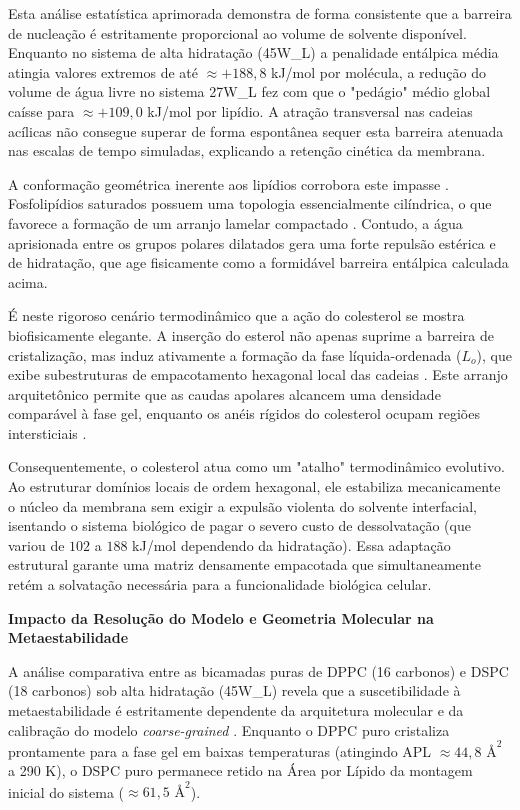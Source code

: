 Esta análise estatística aprimorada demonstra de forma consistente que a barreira de nucleação é estritamente proporcional ao volume de solvente disponível. Enquanto no sistema de alta hidratação (45W\_L) a penalidade entálpica média atingia valores extremos de até $\approx +188,8$ kJ/mol por molécula, a redução do volume de água livre no sistema 27W\_L fez com que o "pedágio" médio global caísse para $\approx +109,0$ kJ/mol por lipídio. A atração transversal nas cadeias acílicas não consegue superar de forma espontânea sequer esta barreira atenuada nas escalas de tempo simuladas, explicando a retenção cinética da membrana.

A conformação geométrica inerente aos lipídios corrobora este impasse \cite{lee2022}. Fosfolipídios saturados possuem uma topologia essencialmente cilíndrica, o que favorece a formação de um arranjo lamelar compactado \cite{lee2022}. Contudo, a água aprisionada entre os grupos polares dilatados gera uma forte repulsão estérica e de hidratação, que age fisicamente como a formidável barreira entálpica calculada acima.

É neste rigoroso cenário termodinâmico que a ação do colesterol se mostra biofisicamente elegante. A inserção do esterol não apenas suprime a barreira de cristalização, mas induz ativamente a formação da fase líquida-ordenada ($L_o$), que exibe subestruturas de empacotamento hexagonal local das cadeias \cite{sodt2014}. Este arranjo arquitetônico permite que as caudas apolares alcancem uma densidade comparável à fase gel, enquanto os anéis rígidos do colesterol ocupam regiões intersticiais \cite{liu2012, sodt2014}. 

Consequentemente, o colesterol atua como um "atalho" termodinâmico evolutivo. Ao estruturar domínios locais de ordem hexagonal, ele estabiliza mecanicamente o núcleo da membrana sem exigir a expulsão violenta do solvente interfacial, isentando o sistema biológico de pagar o severo custo de dessolvatação (que variou de $102$ a $188$ kJ/mol dependendo da hidratação). Essa adaptação estrutural garante uma matriz densamente empacotada que simultaneamente retém a solvatação necessária para a funcionalidade biológica celular.

\vspace{1em}
\noindent\textbf{Impacto da Resolução do Modelo e Geometria Molecular na Metaestabilidade }

A análise comparativa entre as bicamadas puras de DPPC (16 carbonos) e DSPC (18 carbonos) sob alta hidratação (45W\_L) revela que a suscetibilidade à metaestabilidade é estritamente dependente da arquitetura molecular e da calibração do modelo \textit{coarse-grained} \cite{ramirez2025}. Enquanto o DPPC puro cristaliza prontamente para a fase gel em baixas temperaturas (atingindo APL $\approx 44,8 \text{ \AA}^2$ a 290 K), o DSPC puro permanece retido na Área por Lípido da montagem inicial do sistema ($\approx 61,5 \text{ \AA}^2$). 

